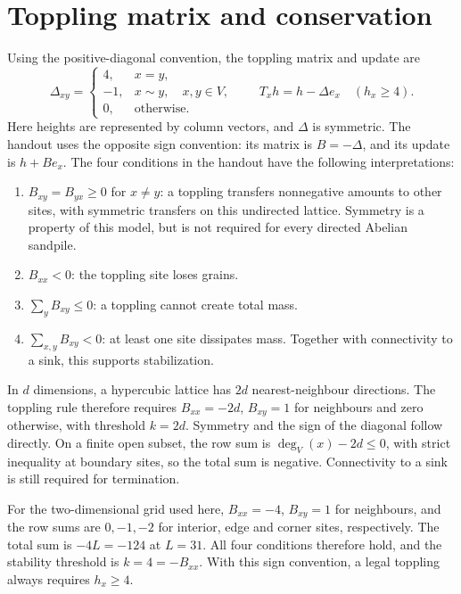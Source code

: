 \documentclass[11pt,a4paper,oneside]{report}
\numberwithin{equation}{chapter}
\begin{document}
\section{Toppling matrix and conservation}
\label{sec:matrix}
Using the positive-diagonal convention, the toppling matrix and update are
\begin{equation}
 \Delta_{xy}=
 \begin{cases}
 4,&x=y,\\
 -1,&x\sim y,\quad x,y\in V,\\
 0,&\text{otherwise}.
 \end{cases}
 \qquad T_x h=h-\Delta e_x\quad(h_x\geq4).
 \label{eq:matrix}
\end{equation}
Here heights are represented by column vectors, and $\Delta$ is symmetric. The handout uses the opposite sign convention: its matrix is $B=-\Delta$, and its update is $h+B e_x$. The four conditions in the handout have the following interpretations:
\begin{enumerate}
 \item $B_{xy}=B_{yx}\geq0$ for $x\ne y$: a toppling transfers nonnegative amounts to other sites, with symmetric transfers on this undirected lattice. Symmetry is a property of this model, but is not required for every directed Abelian sandpile.
 \item $B_{xx}<0$: the toppling site loses grains.
 \item $\sum_y B_{xy}\leq0$: a toppling cannot create total mass.
 \item $\sum_{x,y}B_{xy}<0$: at least one site dissipates mass. Together with connectivity to a sink, this supports stabilization.
\end{enumerate}
In $d$ dimensions, a hypercubic lattice has $2d$ nearest-neighbour directions. The toppling rule therefore requires $B_{xx}=-2d$, $B_{xy}=1$ for neighbours and zero otherwise, with threshold $k=2d$. Symmetry and the sign of the diagonal follow directly. On a finite open subset, the row sum is $\deg_V(x)-2d\leq0$, with strict inequality at boundary sites, so the total sum is negative. Connectivity to a sink is still required for termination.

For the two-dimensional grid used here, $B_{xx}=-4$, $B_{xy}=1$ for neighbours, and the row sums are $0,-1,-2$ for interior, edge and corner sites, respectively. The total sum is $-4L=-124$ at $L=31$. All four conditions therefore hold, and the stability threshold is $k=4=-B_{xx}$. With this sign convention, a legal toppling always requires $h_x\geq4$.
\end{document}

